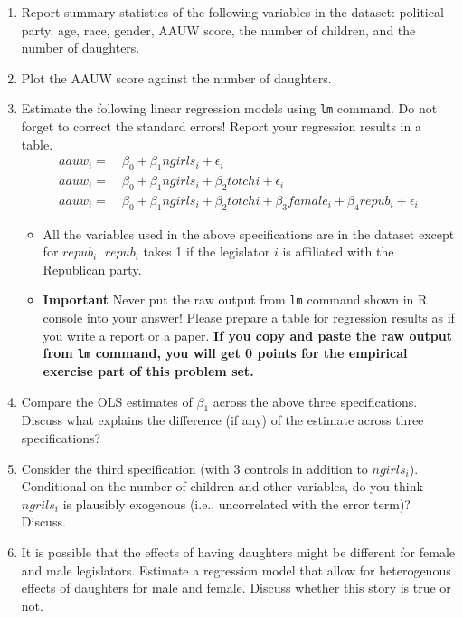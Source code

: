 \documentclass[]{book}
\providecommand{\tightlist}{%
  \setlength{\itemsep}{0pt}\setlength{\parskip}{0pt}}
\begin{document}
\begin{enumerate}
\def\labelenumi{\arabic{enumi}.}
\tightlist
\item
  Report summary statistics of the following variables in the dataset:
  political party, age, race, gender, AAUW score, the number of
  children, and the number of daughters.
\item
  Plot the AAUW score against the number of daughters.
\item
  Estimate the following linear regression models using \texttt{lm}
  command. Do not forget to correct the standard errors! Report your
  regression results in a table. \[
  \begin{aligned}
  aauw_i = \ & \beta_0 + \beta_1 ngirls_i + \epsilon_i \\
  aauw_i = \ & \beta_0 + \beta_1 ngirls_i + \beta_2 totchi + \epsilon_i \\
  aauw_i = \ & \beta_0 + \beta_1 ngirls_i + \beta_2 totchi + \beta_3 famale_i + \beta_4 repub_i + \epsilon_i 
  \end{aligned}
  \]

  \begin{itemize}
  \tightlist
  \item
    All the variables used in the above specifications are in the
    dataset except for \(repub_i\). \(repub_i\) takes 1 if the
    legislator \(i\) is affiliated with the Republican party.
  \item
    \textbf{Important} Never put the raw output from \texttt{lm} command
    shown in R console into your answer! Please prepare a table for
    regression results as if you write a report or a paper. \textbf{If
    you copy and paste the raw output from \texttt{lm} command, you will
    get 0 points for the empirical exercise part of this problem set.}
  \end{itemize}
\item
  Compare the OLS estimates of \(\beta_1\) across the above three
  specifications. Discuss what explains the difference (if any) of the
  estimate across three specifications?
\item
  Consider the third specification (with 3 controls in addition to
  \(ngirls_i\)). Conditional on the number of children and other
  variables, do you think \(ngrils_i\) is plausibly exogenous (i.e.,
  uncorrelated with the error term)? Discuss.
\item
  It is possible that the effects of having daughters might be different
  for female and male legislators. Estimate a regression model that
  allow for heterogenous effects of daughters for male and female.
  Discuss whether this story is true or not.
\end{enumerate}
\end{document}
